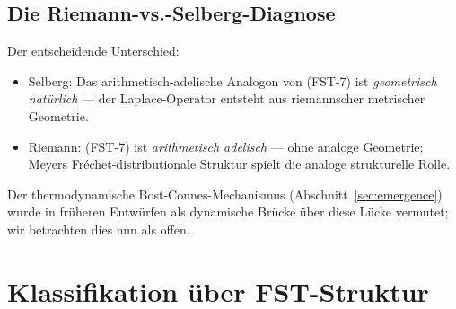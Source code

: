 \documentclass[11pt,a4paper]{article}
\theoremstyle{plain}
\theoremstyle{definition}
\begin{document}
\subsection{Die Riemann-vs.-Selberg-Diagnose}

Der entscheidende Unterschied:
\begin{itemize}
\item Selberg: Das arithmetisch-adelische Analogon von (FST-7) ist
  \emph{geometrisch natürlich} --- der Laplace-Operator entsteht aus
  riemannscher metrischer Geometrie.
\item Riemann: (FST-7) ist \emph{arithmetisch adelisch} --- ohne analoge
  Geometrie; Meyers Fréchet-distributionale Struktur spielt die analoge
  strukturelle Rolle.
\end{itemize}

Der thermodynamische Bost-Connes-Mechanismus (Abschnitt~\ref{sec:emergence})
wurde in früheren Entwürfen als dynamische Brücke über diese Lücke
vermutet; wir betrachten dies nun als offen.

\section{Klassifikation über FST-Struktur}
\label{sec:classification}
\end{document}
